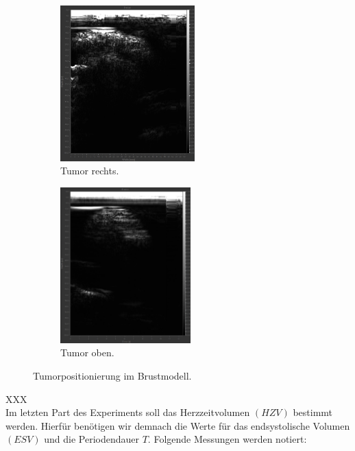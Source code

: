 \begin{figure}
    \begin{subfigure}{0.48\textwidth}
        \centering
        \includegraphics[height=6cm]{Tumor_rechts_2.jpg}
        \caption{Tumor rechts.}
        \label{fig:TR}
    \end{subfigure}
    \hfill
    \begin{subfigure}{0.48\textwidth}
        \centering 
        \includegraphics[height=6cm]{Tumor_oben.jpg}
        \caption{Tumor oben.}
        \label{fig:TO}
    \end{subfigure}
    \caption{Tumorpositionierung im Brustmodell.}
    \label{fig:Vergleich}
\end{figure}

\noindent XXX\\

\noindent Im letzten Part des Experiments soll das Herzzeitvolumen $\left(HZV\right)$ bestimmt werden. Hierfür benötigen wir demnach 
die Werte für das endsystolische Volumen $\left(ESV\right)$ und die Periodendauer $T$. Folgende Messungen werden notiert:

